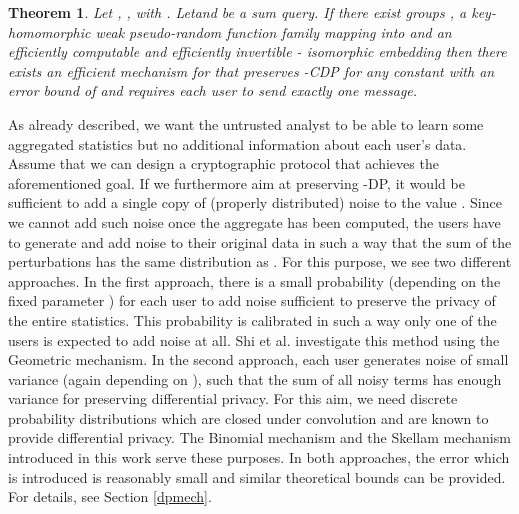 \documentclass[10pt]{extarticle}
\newtheorem{Thm}{Theorem}
\begin{document}
\begin{Thm}\label{mainthm} Let , ,  with . Let\linebreak  and  be a sum query. If there exist groups , a key-homomorphic weak pseudo-random function family mapping into  and an efficiently computable and efficiently invertible - isomorphic embedding  then there exists an efficient mechanism for  that preserves -\mbox{\upshape\sffamily CDP} for any constant  with an error bound of  and requires each user to send exactly one message.
\end{Thm}

As already described, we want the untrusted analyst to be able to learn some aggregated statistics  but no additional information about each user's data. Assume that we can design a cryptographic protocol that achieves the aforementioned goal. If we furthermore aim at preserving -\mbox{\upshape\sffamily DP}, it would be sufficient to add a single copy of (properly distributed) noise  to the value . Since we cannot add such noise once the aggregate has been computed, the users have to generate and add noise to their original data in such a way that the sum of the perturbations has the same distribution as . For this purpose, we see two different approaches. In the first approach, there is a small probability (depending on the fixed parameter ) for each user to add noise sufficient to preserve the privacy of the entire statistics. This probability is calibrated in such a way only one of the  users is expected to add noise at all. Shi et al. \cite{2} investigate this method using the Geometric mechanism. In the second approach, each user generates noise of small variance (again depending on ), such that the sum of all noisy terms has enough variance for preserving differential privacy. For this aim, we need discrete probability distributions which are closed under convolution and are known to provide differential privacy. The Binomial mechanism \cite{14} and the Skellam mechanism introduced in this work serve these purposes. In both approaches, the error which is introduced is reasonably small and similar theoretical bounds can be provided. For details, see Section \ref{dpmech}.
\end{document}
